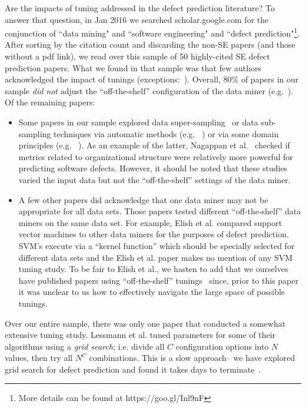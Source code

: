 \documentclass[final,twocolumn,5p]{elsarticle}
\newcommand{\bi}{\begin{itemize}[leftmargin=0.4cm]}
\newcommand{\ei}{\end{itemize}}
\begin{document}
Are the impacts of tuning addressed in the defect prediction literature?
To answer that question,  in Jan 2016 we searched scholar.google.com for the conjunction of ``data mining" and ``software engineering" and  ``defect prediction"\footnote{More details can be found at https://goo.gl/Inl9nF}.
After sorting by the citation count and discarding the non-SE papers (and those without a pdf link), we read over this sample
of  50 highly-cited SE defect prediction papers. 
What we found in that sample was that few authors
acknowledged the impact of tunings (exceptions:~\cite{Gao:2011,lessmann2008benchmarking}).
Overall,  80\% of papers in our sample {\em did not} adjust
the ``off-the-shelf'' configuration of the data miner (e.g.~\cite{me07b,Moser:2008,Elish2008649}). Of the remaining papers:
\bi
\item
Some papers in our sample  explored   data super-sampling~\cite{4271036} or data sub-sampling techniques via  automatic methods (e.g. ~\cite{Gao:2011,me07b,4271036,Kim:2011}) 
or via some domain principles (e.g. ~\cite{Moser:2008,Nagappan:2008,Hassan:2009}).
As an example of the latter, Nagappan et al.~\cite{Nagappan:2008} checked if metrics related to organizational structure were relatively more powerful for predicting software defects. 
However, it should be noted that  these studies varied the input data but
not the   ``off-the-shelf''   settings of the data miner.
\item
A few other papers did acknowledge that one data miner may not be appropriate
for all data sets.  Those papers tested  different  
``off-the-shelf'' data miners on the same data set.
For example, Elish et al.\cite{Elish2008649}  compared support vector
machines to other data miners for the purposes of defect prediction. SVM's execute via a ``kernel function'' which should be specially selected for different data sets and
the Elish et al. paper  makes no mention of any SVM tuning study.  
To be fair to Elish et al., we hasten to add that we
ourselves have  published
papers using ``off-the-shelf'' tunings~\cite{me07b} since,
prior to this paper it was unclear to us how to effectively
navigate the large space of possible tunings.
\ei
Over our entire sample, there was only  one paper that conducted a somewhat extensive tuning study.
Lessmann et al.\cite{lessmann2008benchmarking} tuned parameters for some of their algorithms using  a {\em grid search}; i.e. divide all $C$ configuration
options into $N$ values, then try all   $N^C$ combinations.
This is a slow approach-- we have explored grid search for 
defect prediction and found it takes days to terminate~\cite{me07b}.
\end{document}
